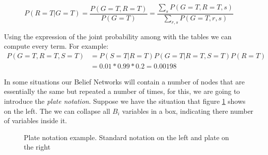 \begin{exampleth}
\[
P(R = T | G = T) = \frac{P(G = T, R = T)}{P(G=T)} = \frac{\sum_{s}P(G=T, R=T,
s)}{\sum_{r,s} P(G=T, r, s)}
\]

Using the expression of the joint probability among with the tables we can
compute every term. For example:
\[
\begin{aligned}
P(G=T, R=T, S=T) &= P(S=T|R=T)P(G=T|R=T,S=T)P(R=T) \\
&= 0.01 * 0.99 * 0.2 = 0.00198
\end{aligned}
\]
\end{exampleth}


In some situations our Belief Networks will contain a number of nodes that are
essentially the same but repeated a number of times, for this, we are going to
introduce the \emph{plate notation}. Suppose we have the situation that figure
\ref{fig:plate_notation} shows on the left. The we can collapse all \(B_i\)
variables in a box, indicating there number of variables inside it.

\begin{figure}[h!]
\centering
{}
\caption{Plate notation example. Standard notation on the left and plate on the right}\label{fig:plate_notation}
\end{figure}
